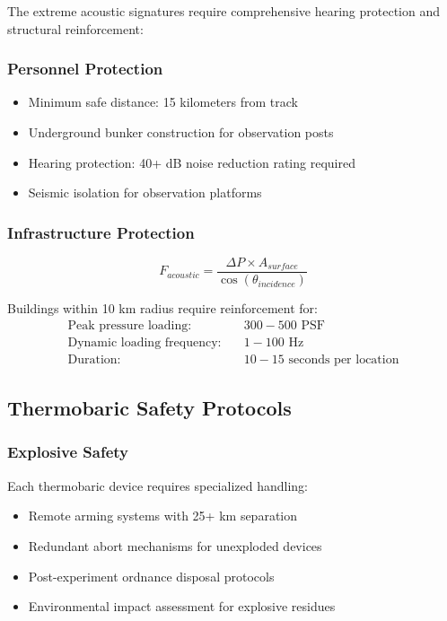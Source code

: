 \documentclass[12pt,a4paper]{article}
\begin{document}
The extreme acoustic signatures require comprehensive hearing protection and structural reinforcement:

\subsubsection{Personnel Protection}
\begin{itemize}
\item Minimum safe distance: 15 kilometers from track
\item Underground bunker construction for observation posts
\item Hearing protection: 40+ dB noise reduction rating required
\item Seismic isolation for observation platforms
\end{itemize}

\subsubsection{Infrastructure Protection}
\begin{equation}
F_{acoustic} = \frac{\Delta P \times A_{surface}}{\cos(\theta_{incidence})}
\label{eq:acoustic_force}
\end{equation}

Buildings within 10 km radius require reinforcement for:
\begin{align}
\text{Peak pressure loading:} &\quad 300-500 \text{ PSF} \\
\text{Dynamic loading frequency:} &\quad 1-100 \text{ Hz} \\
\text{Duration:} &\quad 10-15 \text{ seconds per location}
\end{align}

\subsection{Thermobaric Safety Protocols}

\subsubsection{Explosive Safety}
Each thermobaric device requires specialized handling:

\begin{itemize}
\item Remote arming systems with 25+ km separation
\item Redundant abort mechanisms for unexploded devices
\item Post-experiment ordnance disposal protocols
\item Environmental impact assessment for explosive residues
\end{itemize}
\end{document}
